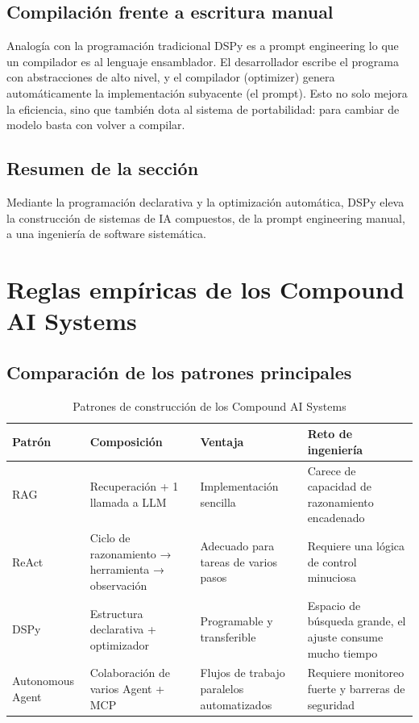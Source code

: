 \documentclass[a4paper]{article}
\begin{document}
\subsection{Compilación frente a escritura manual}

\begin{knowledgebox}{Analogía con la programación tradicional}
DSPy es a prompt engineering lo que un compilador es al lenguaje ensamblador. El desarrollador escribe el programa con abstracciones de alto nivel, y el compilador (optimizer) genera automáticamente la implementación subyacente (el prompt). Esto no solo mejora la eficiencia, sino que también dota al sistema de portabilidad: para cambiar de modelo basta con volver a compilar.
\end{knowledgebox}

\subsection{Resumen de la sección}

Mediante la programación declarativa y la optimización automática, DSPy eleva la construcción de sistemas de IA compuestos, de la prompt engineering manual, a una ingeniería de software sistemática.

\section{Reglas empíricas de los Compound AI Systems}

\subsection{Comparación de los patrones principales}

\begin{table}[H]
\centering
\caption{Patrones de construcción de los Compound AI Systems}
\begin{tabular}{p{}p{}p{}p{}}
\toprule
Patrón & Composición & Ventaja & Reto de ingeniería \\
\midrule
RAG & Recuperación + 1 llamada a LLM & Implementación sencilla & Carece de capacidad de razonamiento encadenado \\
ReAct & Ciclo de razonamiento → herramienta → observación & Adecuado para tareas de varios pasos & Requiere una lógica de control minuciosa \\
DSPy & Estructura declarativa + optimizador & Programable y transferible & Espacio de búsqueda grande, el ajuste consume mucho tiempo \\
Autonomous Agent & Colaboración de varios Agent + MCP & Flujos de trabajo paralelos automatizados & Requiere monitoreo fuerte y barreras de seguridad \\
\bottomrule
\end{tabular}
\end{table}
\end{document}
